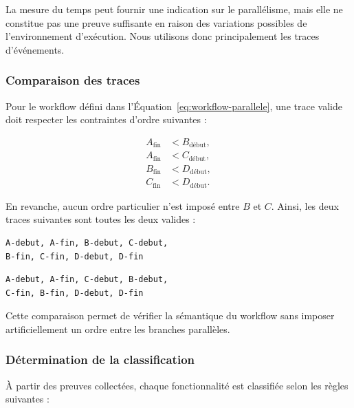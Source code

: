 La mesure du temps peut fournir une indication sur le parallélisme,
mais elle ne constitue pas une preuve suffisante en raison des
variations possibles de l'environnement d'exécution. Nous utilisons
donc principalement les traces d'événements.


\subsubsection{Comparaison des traces}

Pour le workflow défini dans l'Équation~\ref{eq:workflow-parallele}, une
trace valide doit respecter les contraintes d'ordre suivantes :

\begin{align}
A_{\text{fin}} &< B_{\text{début}}, \\
A_{\text{fin}} &< C_{\text{début}}, \\
B_{\text{fin}} &< D_{\text{début}}, \\
C_{\text{fin}} &< D_{\text{début}}.
\end{align}

En revanche, aucun ordre particulier n'est imposé entre $B$ et $C$.
Ainsi, les deux traces suivantes sont toutes les deux valides :

\begin{verbatim}
A-debut, A-fin, B-debut, C-debut,
B-fin, C-fin, D-debut, D-fin
\end{verbatim}

\begin{verbatim}
A-debut, A-fin, C-debut, B-debut,
C-fin, B-fin, D-debut, D-fin
\end{verbatim}

Cette comparaison permet de vérifier la sémantique du workflow sans
imposer artificiellement un ordre entre les branches parallèles.


\subsubsection{Détermination de la classification}

À partir des preuves collectées, chaque fonctionnalité est classifiée
selon les règles suivantes :

